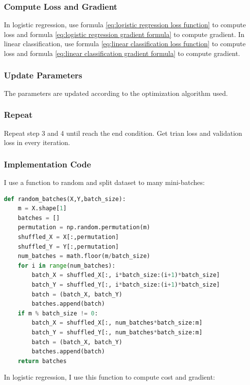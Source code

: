 \documentclass[journal, a4paper]{IEEEtran}
\begin{document}
\subsubsection{Compute Loss and Gradient} \label{compute loss and gradient}
In logistic regression, use formula \eqref{eq:logistic regression loss function} to compute loss and formula \eqref{eq:logistic regression gradient formula} to compute gradient.
In linear classification, use formula \eqref{eq:linear classification loss function} to compute loss and formula \eqref{eq:linear classification gradient formula} to compute gradient.




\subsubsection{Update Parameters} \label{update parameters}
The parameters are updated according to the optimization algorithm used.


\subsubsection{Repeat}
Repeat step 3 and 4 until reach the end condition. Get trian loss and validation loss in every iteration.


\subsubsection{Implementation Code}

I use a function to random and split dataset to many mini-batches:
\begin{lstlisting}[language=Python]
def random_batches(X,Y,batch_size):
    m = X.shape[1]
    batches = []
    permutation = np.random.permutation(m)
    shuffled_X = X[:,permutation]
    shuffled_Y = Y[:,permutation]
    num_batches = math.floor(m/batch_size)
    for i in range(num_batches):
        batch_X = shuffled_X[:, i*batch_size:(i+1)*batch_size]
        batch_Y = shuffled_Y[:, i*batch_size:(i+1)*batch_size]
        batch = (batch_X, batch_Y)
        batches.append(batch)
    if m % batch_size != 0:
        batch_X = shuffled_X[:, num_batches*batch_size:m]
        batch_Y = shuffled_Y[:, num_batches*batch_size:m]
        batch = (batch_X, batch_Y)
        batches.append(batch)
    return batches
\end{lstlisting}
In logistic regression, I use this function to compute cost and gradient:
\end{document}
